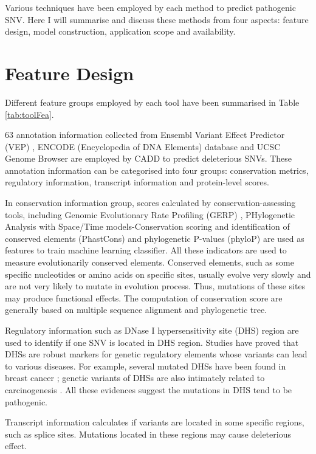 \documentclass[a4paper,nohyper,nobib,openany,justified]{tufte-book}
\begin{document}
\begin{fullwidth}
Various techniques have been employed by each method to predict pathogenic SNV. Here I will summarise and discuss these methods from four aspects: feature design, model construction, application scope and availability.

\section{Feature Design}

Different feature groups employed by each tool have been summarised in Table \ref{tab:toolFea}.

63 annotation information collected from Ensembl Variant Effect Predictor (VEP) \cite{McLaren2010}, ENCODE (Encyclopedia of DNA Elements) database \cite{Dunham2012} and UCSC Genome Browser \cite{Kent2002} are employed by CADD to predict deleterious SNVs. These annotation information can be categorised into four groups: conservation metrics, regulatory information, transcript information and protein-level scores.

In conservation information group, scores calculated by conservation-assessing tools, including Genomic Evolutionary Rate Profiling (GERP) \cite{Cooper2005}, PHylogenetic Analysis with Space/Time models-Conservation scoring and identification of conserved elements (PhastCons) \cite{Siepel2005} and phylogenetic P-values (phyloP) \cite{Pollard2010} are used as features to train machine learning classifier. All these indicators are used to measure evolutionarily conserved elements. Conserved elements, such as some specific nucleotides or amino acids on specific sites, usually evolve very slowly and are not very likely to mutate in evolution process. Thus, mutations of these sites may produce functional effects. The computation of conservation score are generally based on multiple sequence alignment and phylogenetic tree.

Regulatory information such as DNase I hypersensitivity site (DHS) region are used to identify if one SNV is located in DHS region. Studies have proved that DHSs are robust markers for genetic regulatory elements \cite{Boyle2008} whose variants can lead to various diseases. For example, several mutated DHSs have been found in breast cancer \cite{DAntonio2017}; genetic variants of DHSs are also intimately related to carcinogenesis \cite{Maurano2015}. All these evidences suggest the mutations in DHS tend to be pathogenic.

Transcript information calculates if variants are located in some specific regions, such as splice sites. Mutations located in these regions may cause deleterious effect.


\end{fullwidth}
\end{document}

